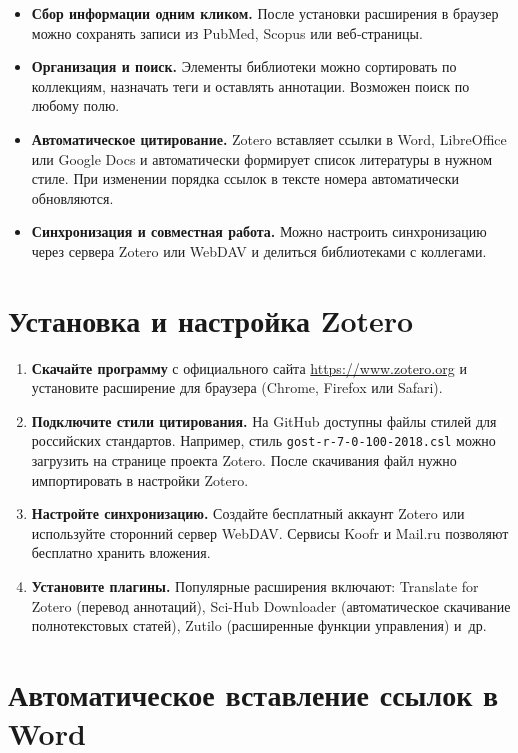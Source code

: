 \documentclass[
  russian,
  letterpaper,
]{book}
\providecommand{\tightlist}{%
  \setlength{\itemsep}{0pt}\setlength{\parskip}{0pt}}
\begin{document}
\begin{itemize}
\tightlist
\item
  \textbf{Сбор информации одним кликом.} После установки расширения в
  браузер можно сохранять записи из PubMed, Scopus или веб‑страницы.
\item
  \textbf{Организация и поиск.} Элементы библиотеки можно сортировать по
  коллекциям, назначать теги и оставлять аннотации. Возможен поиск по
  любому полю.
\item
  \textbf{Автоматическое цитирование.} Zotero вставляет ссылки в Word,
  LibreOffice или Google Docs и автоматически формирует список
  литературы в нужном стиле. При изменении порядка ссылок в тексте
  номера автоматически обновляются.
\item
  \textbf{Синхронизация и совместная работа.} Можно настроить
  синхронизацию через сервера Zotero или WebDAV и делиться библиотеками
  с коллегами.
\end{itemize}

\chapter{Установка и настройка
Zotero}\label{ux443ux441ux442ux430ux43dux43eux432ux43aux430-ux438-ux43dux430ux441ux442ux440ux43eux439ux43aux430-zotero}

\begin{enumerate}
\def\labelenumi{\arabic{enumi}.}
\tightlist
\item
  \textbf{Скачайте программу} с официального сайта
  \url{https://www.zotero.org} и установите расширение для браузера
  (Chrome, Firefox или Safari).
\item
  \textbf{Подключите стили цитирования.} На GitHub доступны файлы стилей
  для российских стандартов. Например, стиль
  \texttt{gost-r-7-0-100-2018.csl} можно загрузить на странице проекта
  Zotero. После скачивания файл нужно импортировать в настройки Zotero.
\item
  \textbf{Настройте синхронизацию.} Создайте бесплатный аккаунт Zotero
  или используйте сторонний сервер WebDAV. Сервисы Koofr и Mail.ru
  позволяют бесплатно хранить вложения.
\item
  \textbf{Установите плагины.} Популярные расширения включают: Translate
  for Zotero (перевод аннотаций), Sci-Hub Downloader (автоматическое
  скачивание полнотекстовых статей), Zutilo (расширенные функции
  управления) и~др.
\end{enumerate}

\chapter{Автоматическое вставление ссылок в
Word}\label{ux430ux432ux442ux43eux43cux430ux442ux438ux447ux435ux441ux43aux43eux435-ux432ux441ux442ux430ux432ux43bux435ux43dux438ux435-ux441ux441ux44bux43bux43eux43a-ux432-word}
\end{document}
